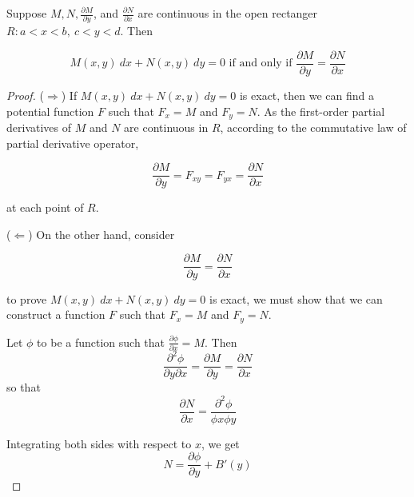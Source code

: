 \begin{theorem}
    Suppose $M,N, \frac{\partial M}{\partial y}$, and $\frac{\partial N}{\partial x}$ are continuous in the open 
    rectanger $R: a< x<b, \> c < y < d$. Then 

    \begin{equation}
        M(x,y)\> dx + N(x,y)\> dy = 0 \text{ if and only if } \frac{\partial M}{\partial y} = \frac{\partial N}{\partial x}
    \end{equation}
\end{theorem}
\begin{proof}
    ($\Rightarrow$) If $M(x,y)\> dx + N(x,y)\> dy = 0$ is exact, then we can find a potential 
    function $F$ such that $F_x = M$ and $F_y = N$. As the first-order partial derivatives of $M$ and 
    $N$ are continuous in $R$, according to the commutative law of partial derivative operator,

    \begin{equation}
        \frac{\partial M}{\partial y} = F_{xy} = F_{yx} = \frac{\partial N}{\partial x}
    \end{equation}

    at each point of $R$.

    ($\Leftarrow$) On the other hand, consider 
    
    \begin{equation}
        \frac{\partial M}{\partial y} = \frac{\partial N}{\partial x}
    \end{equation}

    to prove $M(x,y)\> dx + N(x,y)\> dy = 0$ is exact, we must show that we can construct a function $F$
    such that $F_x = M$ and $F_y = N$.

    Let $\phi$ to be a function such that $\frac{\partial \phi}{\partial x} = M$. Then 
    \begin{equation}
        \frac{\partial^2 \phi}{\partial y \partial x} = \frac{\partial M}{\partial y} = \frac{\partial N}{\partial x}
    \end{equation}
    so that 
    \begin{equation}
        \frac{\partial N}{\partial x} = \frac{\partial^2 \phi}{\phi x \phi y}
    \end{equation}

    Integrating both sides with respect to $x$, we get 
    \begin{equation}
        N = \frac{\partial \phi}{\partial y} + B'(y)
    \end{equation}
\end{proof}

